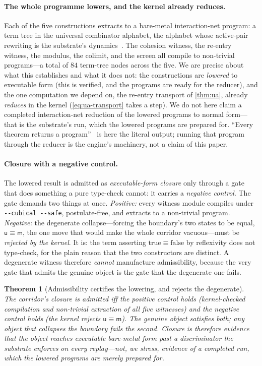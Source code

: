 \documentclass[11pt,letterpaper]{article}
\theoremstyle{plain}
\newtheorem{theorem}{Theorem}[section]
\theoremstyle{definition}
\theoremstyle{remark}
\newcommand{\unmk}{\mathsf{u}}                          %
\newcommand{\mkd}{\mathsf{m}}                           %
\begin{document}
\paragraph{The whole programme lowers, and the kernel already reduces.}
Each of the five constructions extracts to a bare-metal interaction-net program: a
term tree in the universal combinator alphabet, the alphabet whose active-pair
rewriting is the substrate's dynamics~\citep{lafont1997interaction}. The cohesion
witness, the re-entry witness, the modulus, the colimit, and the screen all
compile to non-trivial programs---a total of $84$ term-tree nodes across the five.
We are precise about what this establishes and what it does not: the constructions
are \emph{lowered} to executable form (this is verified, and the programs are ready
for the reducer), and the one computation we depend on, the re-entry transport of
\cref{thm:ua}, already \emph{reduces} in the kernel (\cref{eq:ua-transport} takes a
step). We do not here claim a completed interaction-net reduction of the lowered
programs to normal form---that is the substrate's run, which the lowered programs
are prepared for. ``Every theorem returns a program''~\citep{iaom_spectrum} is here
the literal output; running that program through the reducer is the engine's
machinery, not a claim of this paper.

\paragraph{Closure with a negative control.}
The lowered result is admitted as \emph{executable-form closure} only through a
gate that does something a pure type-check cannot: it carries a \emph{negative
control}. The gate demands two things at once. \emph{Positive:} every witness
module compiles under \texttt{-{}-cubical -{}-safe}, postulate-free, and extracts
to a non-trivial program. \emph{Negative:} the degenerate collapse---forcing the
boundary's two states to be equal, $\unmk\equiv\mkd$, the one move that would make
the whole corridor vacuous---must be \emph{rejected by the kernel}. It is: the term
asserting $\mathrm{true}\equiv\mathrm{false}$ by reflexivity does not type-check,
for the plain reason that the two constructors are distinct. A degenerate witness
therefore \emph{cannot} manufacture admissibility, because the very gate that
admits the genuine object is the gate that the degenerate one fails.

\begin{theorem}[Admissibility certifies the lowering, and rejects the degenerate]
\label{thm:closure}
The corridor's closure is admitted iff the positive control holds (kernel-checked
compilation and non-trivial extraction of all five witnesses) and the negative
control holds (the kernel rejects $\unmk\equiv\mkd$). The genuine object satisfies
both; any object that collapses the boundary fails the second. Closure is therefore
evidence that the object reaches executable bare-metal form past a discriminator
the substrate enforces on every replay---not, we stress, evidence of a completed
run, which the lowered programs are merely prepared for.
\end{theorem}
\end{document}
